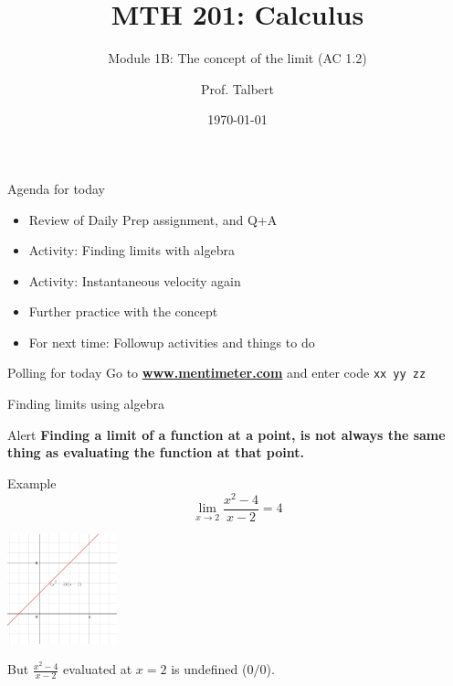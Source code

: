\documentclass{beamer}
\title{MTH 201: Calculus}
\subtitle{Module 1B: The concept of the limit (AC 1.2)}
\author{Prof. Talbert}
\institute{GVSU}
\date{\today}
\begin{document}
\frame{\titlepage}


\begin{frame}{Agenda for today}
    \begin{itemize}
        \item<1-> Review of Daily Prep assignment, and Q+A
        \item<2-> Activity: Finding limits with algebra 
        \item<3-> Activity: Instantaneous velocity again 
        \item<4-> Further practice with the concept
        \item<5-> For next time: Followup activities and things to do 
    \end{itemize}
\end{frame}

\begin{frame}{Polling for today}
    \large{
    Go to \textbf{\url{www.mentimeter.com}} and enter code \texttt{xx yy zz} 
    }
    \end{frame}

\begin{frame}{Finding limits using algebra}
      \begin{alertblock}{Alert}
        \textbf{Finding a limit of a function at a point, is not always the same thing as evaluating the function at that point.}
      \end{alertblock}
      
     \begin{exampleblock}{Example}
     \begin{equation*}
         \lim_{x \to 2} \frac{x^2-4}{x-2} = 4
     \end{equation*}
    \begin{center}
             \includegraphics[width=1.25in]{1b-in-1.png}
    \end{center}
         But $\frac{x^2 - 4}{x-2}$ evaluated at $x=2$ is undefined ($0/0$). 
     \end{exampleblock}
\end{frame}
\end{document}
